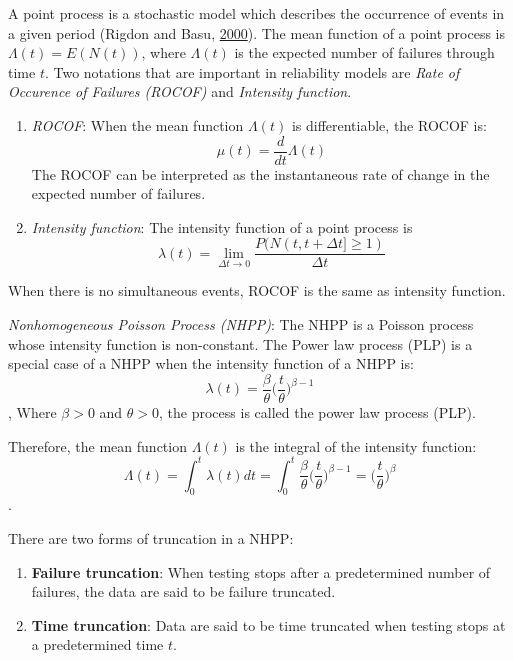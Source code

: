 \documentclass[12pt]{book}
\numberwithin{equation}{chapter}
\providecommand{\tightlist}{%
  \setlength{\itemsep}{0pt}\setlength{\parskip}{0pt}}
\begin{document}
A point process is a stochastic model which describes the occurrence of events in a given period (Rigdon and Basu, \protect\hyperlink{ref-rigdon2000statistical}{2000}). The mean function of a point process is \(\Lambda(t) = E(N(t))\), where \(\Lambda(t)\) is the expected number of failures through time \(t\). Two notations that are important in reliability models are \emph{Rate of Occurence of Failures (ROCOF)} and \emph{Intensity function}.

\begin{enumerate}
\def\labelenumi{\arabic{enumi}.}
\item
  \emph{ROCOF}: When the mean function \(\Lambda(t)\) is differentiable, the ROCOF is:
  \[\mu(t) = \frac{d}{dt}\Lambda(t)\]
  The ROCOF can be interpreted as the instantaneous rate of change in the expected number of failures.
\item
  \emph{Intensity function}: The intensity function of a point process is
  \[\lambda(t) = \lim_{\Delta t \rightarrow 0}\frac{P(N(t, t+\Delta t] \geq 1)}{\Delta t}\]
\end{enumerate}

When there is no simultaneous events, ROCOF is the same as intensity function.

\emph{Nonhomogeneous Poisson Process (NHPP)}: The NHPP is a Poisson process whose intensity function is non-constant. The Power law process (PLP) is a special case of a NHPP when the intensity function of a NHPP is:
\[\lambda(t) = \frac{\beta}{\theta}\bigg(\frac{t}{\theta}\bigg)^{\beta-1}\],
Where \(\beta > 0\) and \(\theta > 0\), the process is called the power law process (PLP).

Therefore, the mean function \(\Lambda(t)\) is the integral of the intensity function:
\[\Lambda(t) = \int_0^t \lambda(t)dt = \int_0^t \frac{\beta}{\theta}\bigg(\frac{t}{\theta}\bigg)^{\beta-1} = \bigg(\frac{t}{\theta}\bigg)^{\beta}\].

There are two forms of truncation in a NHPP:

\begin{enumerate}
\def\labelenumi{\arabic{enumi}.}
\tightlist
\item
  \textbf{Failure truncation}: When testing stops after a predetermined number of failures, the data are said to be failure truncated.
\item
  \textbf{Time truncation}: Data are said to be time truncated when testing stops at a predetermined time \(t\).
\end{enumerate}
\end{document}
